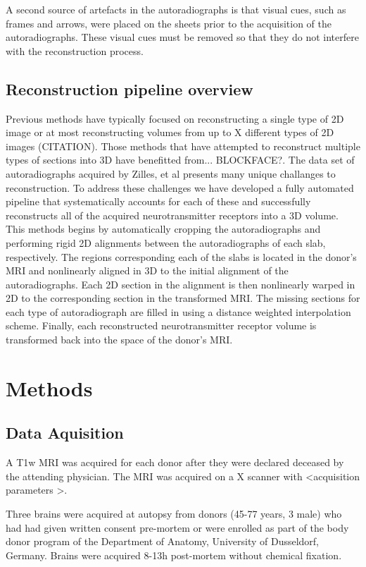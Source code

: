 \documentclass[12pt]{article}
\begin{document}
A second source of artefacts in the autoradiographs is that visual cues, such as frames and arrows, were placed on the sheets prior to the acquisition of the autoradiographs. These visual cues must be removed so that they do not interfere with the reconstruction process. 

\subsection{Reconstruction pipeline overview}
Previous methods have typically focused on reconstructing a single type of 2D image or at most reconstructing volumes from up to X different types of 2D images (CITATION). Those methods that have attempted to reconstruct multiple types of sections into 3D have benefitted from... BLOCKFACE?. The data set of autoradiographs acquired by Zilles, et al \cite{Zilles2004} presents many unique challanges to reconstruction. To address these challenges we have developed a fully automated pipeline that systematically accounts for each of these and successfully reconstructs all of the acquired neurotransmitter receptors into a 3D volume. This methods begins by automatically cropping the autoradiographs and performing rigid 2D alignments between the autoradiographs of each slab, respectively. The regions corresponding each of the slabs is located in the donor's MRI and nonlinearly aligned in 3D to the initial alignment of the autoradiographs. Each 2D section in the alignment is then nonlinearly warped in 2D to the corresponding section in the transformed MRI. The missing sections for each type of autoradiograph are filled in using a distance weighted interpolation scheme. Finally, each reconstructed neurotransmitter receptor volume is transformed back into the space of the donor's MRI.

\section{Methods}
\subsection{Data Aquisition} 

A T1w MRI was acquired for each donor after they were declared deceased by the attending physician. The MRI was acquired on a X scanner with <acquisition parameters >. 

Three brains were acquired at autopsy from donors (45-77 years, 3 male) who had had given written consent pre-mortem or were enrolled as part of the body donor program of the Department of Anatomy, University of Dusseldorf, Germany. Brains were acquired 8-13h post-mortem without chemical fixation.
\end{document}
